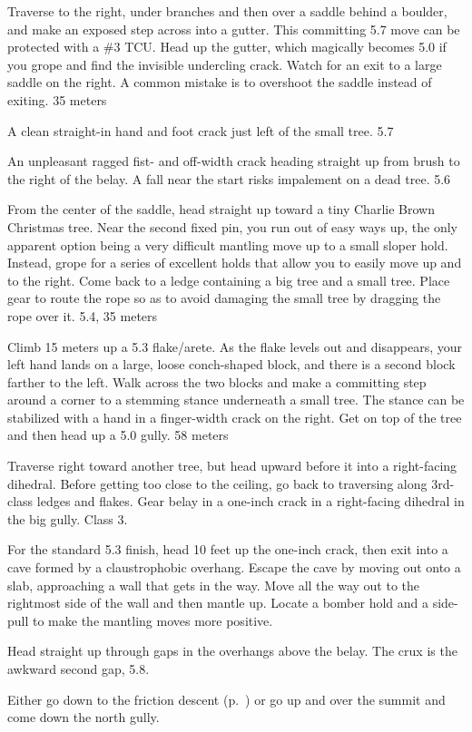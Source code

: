 \documentclass{tahquitz}
\begin{document}
 Traverse to the right, under branches and then over a saddle behind a boulder, and make
an exposed step across into a gutter. This committing 5.7 move can be protected with a
\#3 TCU. Head up the gutter, which magically becomes 5.0 if you grope and find the invisible
undercling crack. Watch for an exit to a large saddle
on the right. A common mistake is to overshoot the saddle instead of
exiting. 35 meters

 A clean straight-in hand and foot crack just left of the small
tree. 5.7

 An unpleasant ragged fist- and off-width crack heading straight up from brush
to the right of the belay. A fall near the start risks impalement on a dead tree. 5.6

 From the center of the saddle, head straight up toward a tiny Charlie Brown Christmas
tree. Near the second fixed pin, you run out of easy ways up, the
only apparent option being a very difficult mantling move up to a
small sloper hold. Instead, grope for a series of excellent holds that allow
you to easily move up and to the right. Come back to a ledge containing a big tree and
a small tree. Place
gear to route the rope so as to avoid damaging the small tree by dragging
the rope over it. 5.4, 35 meters

 Climb 15 meters up a 5.3 flake/arete. As the flake levels out and
disappears, your left hand lands on a large, loose conch-shaped block,
and there is a second block farther to the left. Walk across the two
blocks and make a committing step around a corner to a stemming stance
underneath a small tree. The stance can be stabilized with a hand in a
finger-width crack on the right. Get on top of the tree and then head
up a 5.0 gully. 58 meters

 Traverse right toward another tree, but head upward before
it into a right-facing dihedral.  Before getting too close to the ceiling, go back to traversing
along 3rd-class ledges and flakes.  Gear belay in a one-inch
crack in a right-facing dihedral in the big gully. Class 3.

 For the standard 5.3 finish, head 10 feet up the one-inch crack,
then exit into a cave formed by a claustrophobic overhang.
Escape the cave by moving out onto a slab, approaching
a wall that gets in the way.
Move all the way out to the rightmost side of
the wall and then mantle up. Locate a bomber hold and a side-pull to make
the mantling moves more positive.

 Head straight up through gaps in the overhangs above
the belay. The crux is the awkward second gap, 5.8.

\somespace

\descent Either go down to the friction descent (p.~\pageref{subsec:friction-descent})
or go up and over the summit
and come down the north gully.

\myfooter\vfill %
\end{document}
